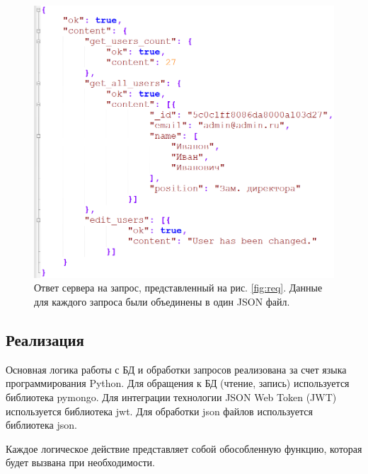 \documentclass[14pt, a4paper]{extarticle}
\begin{document}
    \begin{figure}[h]
        \centering
        \includegraphics[width=1\linewidth]{img/ans.png}
        \caption{Ответ сервера на запрос, представленный на рис. \ref{fig:req}. Данные для каждого запроса были объединены в один JSON файл.}
        \label{fig:ans}
    \end{figure}


    \clearpage
    \subsection{Реализация}
    Основная логика работы с БД и обработки запросов реализована за счет языка программирования Python. Для обращения к БД (чтение, запись) используется библиотека pymongo. Для интеграции технологии JSON Web Token (JWT) используется библиотека jwt. Для обработки json файлов используется библиотека json.

    Каждое логическое действие представляет собой обособленную функцию, которая будет вызвана при необходимости.

    

    

    
\end{document}
